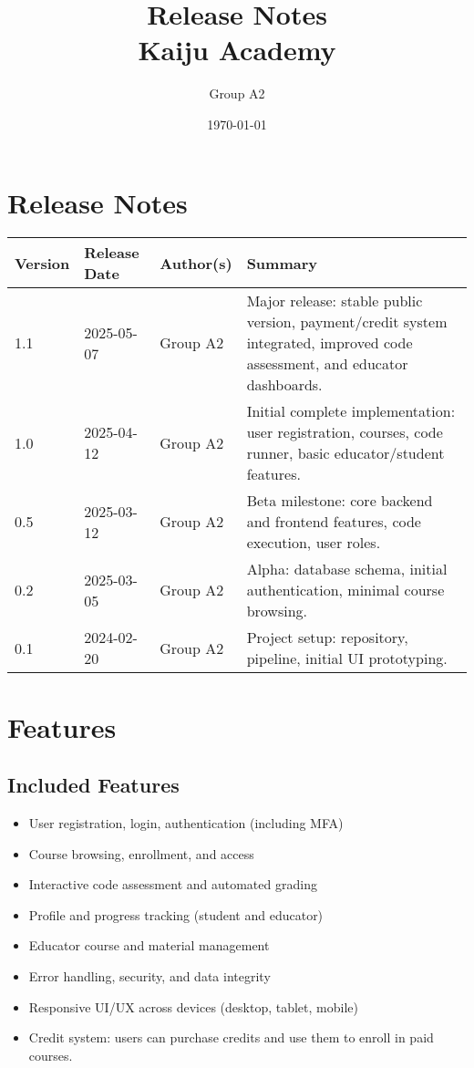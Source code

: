 \documentclass[a4paper,11pt]{scrartcl}
\title{Release Notes\\Kaiju Academy}
\author{Group A2}
\date{\today}
\begin{document}
\maketitle

\section*{Release Notes}

\begin{tabularx}{\textwidth}{l l l X}
\toprule
Version & Release Date & Author(s) & Summary \\
\midrule
1.1 & 2025-05-07 & Group A2 & Major release: stable public version, payment/credit system integrated, improved code assessment, and educator dashboards. \\
1.0 & 2025-04-12 & Group A2 & Initial complete implementation: user registration, courses, code runner, basic educator/student features. \\
0.5 & 2025-03-12 & Group A2 & Beta milestone: core backend and frontend features, code execution, user roles. \\
0.2 & 2025-03-05 & Group A2 & Alpha: database schema, initial authentication, minimal course browsing. \\
0.1 & 2024-02-20 & Group A2 & Project setup: repository, pipeline, initial UI prototyping. \\
\bottomrule
\end{tabularx}

\vspace{1.5em}

\section{Features}

\subsection{Included Features}
\begin{itemize}[leftmargin=*]
    \item User registration, login, authentication (including MFA)
    \item Course browsing, enrollment, and access
    \item Interactive code assessment and automated grading
    \item Profile and progress tracking (student and educator)
    \item Educator course and material management
    \item Error handling, security, and data integrity
    \item Responsive UI/UX across devices (desktop, tablet, mobile)
    \item Credit system: users can purchase credits and use them to enroll in paid courses.
\end{itemize}
\end{document}
